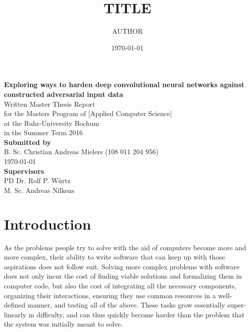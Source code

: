 \documentclass[11pt, a4paper]{article}
\title{TITLE}
\author{AUTHOR}
\date{\today}
\begin{document}
\thispagestyle{empty}

\begin{titlepage}
    \begin{center}
    \vphantom{0cm}
    \huge \textbf{Exploring ways to harden deep convolutional neural networks against constructed adversarial input data} \\
    \vspace{4cm}
    \normalsize
    Written Master Thesis Report \\
    for the Masters Program of \textcolor{AI-BLUE}{[Applied Computer Science]}\\
    at the Ruhr-University Bochum\\
    in the Summer Term 2016\\
    \vspace{4cm}
    \textbf{Submitted by}\\
    B. Sc. Christian Andreas Mielers (108 011 204 956)\\
    \vspace{1cm}
    \today \\
    \vspace{1cm}
    \textbf{Supervisors} \\
    PD Dr. Rolf P. Würtz \\
    M. Sc. Andreas Nilkens
    \end{center}
\end{titlepage}

\newpage
{}
\setcounter{page}{2}

\tableofcontents

\newpage
\section{Introduction}
\label{sec:introduction}

As the problems people try to solve with the aid of computers become more and more complex, their ability to write software that can keep up with those aspirations does not follow suit. Solving more complex problems with software does not only incur the cost of finding viable solutions and formalizing them in computer code, but also the cost of integrating all the necessary components, organizing their interactions, ensuring they use common resources in a well-defined manner, and testing all of the above. These tasks grow essentially super-linearly in difficulty, and can thus quickly become harder than the problem that the system was initially meant to solve.
\end{document}
